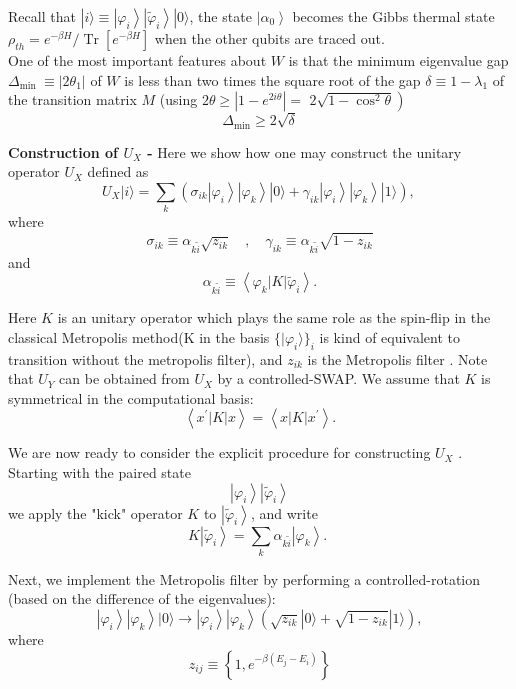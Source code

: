 \begin{flushleft}
	Recall that $|i\rangle \equiv\left|\varphi_i\right\rangle\left|\tilde{\varphi}_i\right\rangle|0\rangle$, the state $\left|\alpha_0\right\rangle$ becomes the Gibbs thermal state $\rho_{t h}=e^{-\beta H} / \operatorname{Tr}\left[e^{-\beta H}\right]$ when the other qubits are traced out.\\
	One of the most important features about $W$ is that the minimum eigenvalue gap $\Delta_{\text {min }} \equiv\left|2 \theta_1\right|$ of $W$ is less than two times the square root of the gap $\delta \equiv 1-\lambda_1$ of the transition matrix $M$ (using $2 \theta \geq\left|1-e^{2 i \theta}\right|=$ $\left.2 \sqrt{1-\cos ^2 \theta}\right)$
	$$
	\Delta_{\min } \geq 2 \sqrt{\delta}
	$$
\end{flushleft}
\begin{flushleft}
	\textbf{Construction of $U_X$ -}
	Here we show how one may construct the unitary operator $U_X$ defined as
	$$
	U_X|i\rangle=\sum_k\left(\sigma_{i k}\left|\varphi_i\right\rangle\left|\varphi_k\right\rangle|0\rangle+\gamma_{i k}\left|\varphi_i\right\rangle\left|\varphi_k\right\rangle|1\rangle\right) \text {, }
	$$
	where
	$$
	\sigma_{i k} \equiv \alpha_{k \tilde{i}} \sqrt{z_{i k}} \quad, \quad \gamma_{i k} \equiv \alpha_{k \tilde{i}} \sqrt{1-z_{i k}}
	$$
	and
	$$
	\alpha_{k \tilde{i}} \equiv\left\langle\varphi_k|K| \tilde{\varphi}_i\right\rangle .
	$$
	
	Here $K$ is an unitary operator which plays the same role as the spin-flip in the classical Metropolis method(K in the basis $\{|\varphi_i\rangle \}_i$ is kind of equivalent to transition without the metropolis filter), and $z_{i k}$ is the Metropolis filter . Note that $U_Y$ can be obtained from $U_X$ by a controlled-SWAP.  We assume that $K$ is symmetrical in the computational basis:
	$$
	\left\langle x^{\prime}|K| x\right\rangle=\left\langle x|K| x^{\prime}\right\rangle .
	$$
	
	We are now ready to consider the explicit procedure for constructing $U_X$ . Starting with the paired state
	$$
	\left|\varphi_i\right\rangle\left|\tilde{\varphi}_i\right\rangle
	$$
	we apply the "kick" operator $K$ to $\left|\tilde{\varphi}_i\right\rangle$, and write
	$$
	K\left|\tilde{\varphi}_i\right\rangle=\sum_k \alpha_{k \tilde{i}}\left|\varphi_k\right\rangle \text {. }
	$$
	
	Next, we implement the Metropolis filter by performing a controlled-rotation (based on the difference of the eigenvalues):
	$$
	\left|\varphi_i\right\rangle\left|\varphi_k\right\rangle|0\rangle \rightarrow\left|\varphi_i\right\rangle\left|\varphi_k\right\rangle\left(\sqrt{z_{i k}}|0\rangle+\sqrt{1-z_{i k}}|1\rangle\right),
	$$
	where
	$$
	z_{i j} \equiv\left\{1, e^{-\beta\left(E_j-E_i\right)}\right\}
	$$
	

\end{flushleft}
